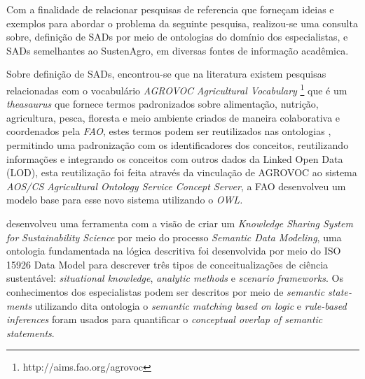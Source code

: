 Com a finalidade de relacionar pesquisas de referencia que forneçam
ideias e exemplos para abordar o problema da seguinte pesquisa, realizou-se
uma consulta sobre, definição de SADs por meio de ontologias do domínio
dos especialistas, e SADs semelhantes ao SustenAgro, em diversas fontes
de informação acadêmica.

Sobre definição de SADs, encontrou-se que na literatura existem pesquisas
relacionadas com o vocabulário \foreignlanguage{english}{\emph{AGROVOC}}\emph{
}\foreignlanguage{english}{\emph{Agricultural Vocabulary}} \footnote{http://aims.fao.org/agrovoc}
que é um \foreignlanguage{english}{\emph{theasaurus}} que fornece
termos padronizados sobre alimentação, nutrição, agricultura, pesca,
floresta e meio ambiente criados de maneira colaborativa e coordenados
pela \emph{FAO}, estes termos podem ser reutilizados nas ontologias
\citep{DCMIPro841}, permitindo uma padronização com os identificadores
dos conceitos, reutilizando informações e integrando os conceitos
com outros dados da \foreignlanguage{english}{Linked Open Data} (\foreignlanguage{english}{LOD}),
esta reutilização foi feita através da vinculação de \foreignlanguage{english}{AGROVOC}
ao sistema \emph{AOS/CS }\foreignlanguage{english}{\emph{Agricultural
Ontology Service Concept Server}}, a FAO desenvolveu um modelo base
para esse novo sistema utilizando o \foreignlanguage{english}{\emph{OWL}}\emph{.}

\citet{kraines2011system} desenvolveu uma ferramenta com a visão
de criar um \foreignlanguage{english}{\emph{Knowledge Sharing System}}\emph{
for}\foreignlanguage{english}{\emph{ Sustainability Science}} por
meio do processo \foreignlanguage{english}{\emph{Semantic Data Modeling}},
uma ontologia fundamentada na lógica descritiva foi desenvolvida por
meio do ISO 15926 \foreignlanguage{english}{Data Model} para descrever
três tipos de conceitualizações de ciência sustentável: \foreignlanguage{english}{\emph{situational
knowledge}}, \foreignlanguage{english}{\emph{analytic methods}} e
\foreignlanguage{english}{\emph{scenario frameworks}}. Os conhecimentos
dos especialistas podem ser descritos por meio de \foreignlanguage{english}{\emph{semantic
statements}} utilizando dita ontologia o \foreignlanguage{english}{\emph{semantic
matching based on logic}} e \foreignlanguage{english}{\emph{rule-based
inferences}} foram usados para quantificar o \foreignlanguage{english}{\emph{conceptual
overlap of semantic statements}}.

